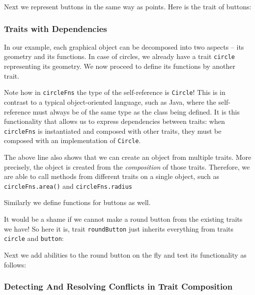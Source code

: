 Next we represent buttons in the same way as points. Here is the trait of
buttons:

\subsubsection{Traits with Dependencies}

In our example, each graphical object can be decomposed into two aspects -- its
geometry and its functions. In case of circles, we already have a trait
\lstinline{circle} representing its geometry. We now proceed to define its
functions by another trait.

Note how in \lstinline$circleFns$ the type of the self-reference is
\lstinline$Circle$! This is in contrast to a typical object-oriented language,
such as Java, where the self-reference must always be of the same type as the
class being defined. It is this functionality that allows us to express
dependencies between traits: when \lstinline$circleFns$ is instantiated and
composed with other traits, they must be composed with an implementation of
\lstinline$Circle$.

The above line also shows that we can create an object from multiple traits.
More precisely, the object is created from the \textit{composition} of those
traits. Therefore, we are able to call methods from different traits on a single
object, such as \lstinline{circleFns.area()} and \lstinline{circleFns.radius}

Similarly we define functions for buttons as well.

It would be a shame if we cannot make a round button from the existing traits we
have! So here it is, trait \lstinline{roundButton} just inherits everything from
traits \lstinline{circle} and \lstinline{button}:

Next we add abilities to the round button on the fly and test its functionality
as follows:



\subsubsection{Detecting And Resolving Conflicts in Trait Composition}
\label{sec:conflicts}

